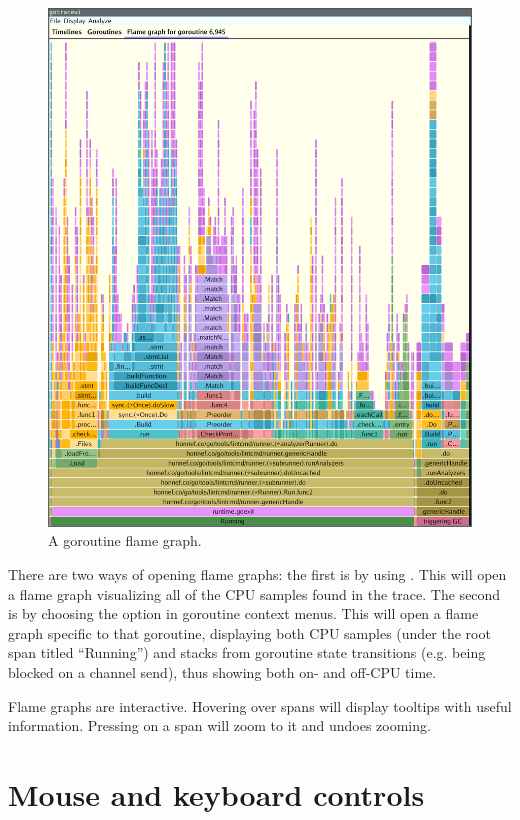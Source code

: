 \documentclass[10pt,letterpaper,oneside,openany,english]{memoir}
\newcommand{\shortcut}{\ctrl{} or \cmdmac}
\begin{document}
\begin{figure}[h!]
  \centering
  \includegraphics[width=\textwidth]{images/screenshots/flame-graph.png}
  \caption{A goroutine flame graph.}
\end{figure}

There are two ways of opening flame graphs:
the first is by using .
This will open a flame graph visualizing all of the CPU samples found in the trace.
The second is by choosing the  option in goroutine context menus.
This will open a flame graph specific to that goroutine,
displaying both CPU samples (under the root span titled \enquote{Running})
and stacks from goroutine state transitions (e.g. being blocked on a channel send),
thus showing both on- and off-CPU time.

Flame graphs are interactive.
Hovering over spans will display tooltips with useful information.
Pressing \keys{\shortcut + LMB} on a span will zoom to it and \keys{\shortcut + Z} undoes zooming.

\section{Mouse and keyboard controls}
\end{document}
